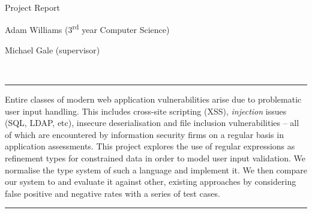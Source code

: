 \documentclass[a4paper,openany]{book}
\begin{document}
\begin{titlepage}
{}
    
    {\par}
    \vspace{1.25cm}
    \vspace{3.5cm}
    {\hspace{0.75cm}\Huge \warwickfont Project Report}
    \vspace{0.16cm}
    {\par}
    {\hspace{0.75cm}\large \warwickfont Adam Williams (3\textsuperscript{rd} year Computer Science)}


    {\hspace{0.75cm}\large \warwickfont Michael Gale (supervisor)}
    \vfill
\end{titlepage}
\restoregeometry
\restorepagecolor

\pagebreak[5]
\newenvironment{abstract}{\centering{\normalfont\Large\sffamily\color{id7-aubergine}Abstract}\vspace{0.3cm}\\
	\hfill\begin{minipage}{0.95\textwidth}
		\rule{\textwidth}{1pt}}
	{\par\noindent\rule{\textwidth}{1pt}\end{minipage}}

\begin{abstract}
	Entire classes of modern web application vulnerabilities arise due to problematic user input handling. This includes cross-site scripting (XSS), \emph{injection} issues (SQL, LDAP, etc), insecure
	deserialisation and file inclusion vulnerabilities – all of which are encountered by information
	security firms on a regular basis in application assessments. This project explores the use of regular expressions as refinement types for constrained data in order to model user input validation. We
	normalise the type system of such a language and implement it. We then compare our system to and evaluate it against other, existing approaches by considering false positive and negative rates with a
	series of test cases. 
\end{abstract}
\end{document}
